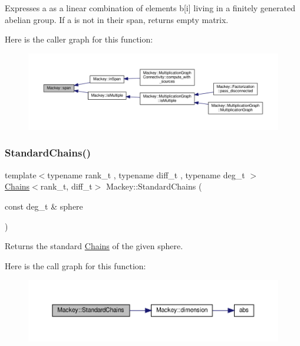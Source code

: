Expresses a as a linear combination of elements b\mbox{[}i\mbox{]} living in a finitely generated abelian group. If a is not in their span, returns empty matrix. 

Here is the caller graph for this function\+:\nopagebreak
\begin{figure}[H]
\begin{center}
\leavevmode
\includegraphics[width=350pt]{namespaceMackey_a1b3e66989e89c8b97d113d8eec0b47b8_icgraph}
\end{center}
\end{figure}
\mbox{\label{namespaceMackey_a425b988266cedec0299fb539d99179b1}} 
\subsubsection{\texorpdfstring{Standard\+Chains()}{StandardChains()}\hspace{0.1cm}{\footnotesize\ttfamily [1/2]}}
{\footnotesize\ttfamily template$<$typename rank\+\_\+t , typename diff\+\_\+t , typename deg\+\_\+t $>$ \\
\hyperlink{classMackey_1_1Chains}{Chains}$<$rank\+\_\+t, diff\+\_\+t$>$ Mackey\+::\+Standard\+Chains (\begin{DoxyParamCaption}\item[{const deg\+\_\+t \&}]{sphere }\end{DoxyParamCaption})}



Returns the standard \hyperlink{classMackey_1_1Chains}{Chains} of the given sphere. 

Here is the call graph for this function\+:\nopagebreak
\begin{figure}[H]
\begin{center}
\leavevmode
\includegraphics[width=350pt]{namespaceMackey_a425b988266cedec0299fb539d99179b1_cgraph}
\end{center}
\end{figure}
\mbox{\label{namespaceMackey_aac9deeccbe291d1dd17df46a3d7c1f2b}} 
